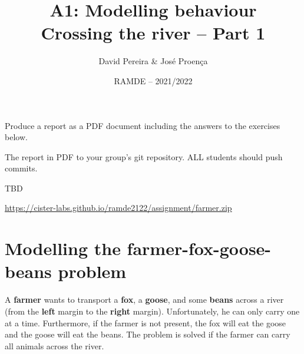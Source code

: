 \documentclass[11pt]{article}
\date{RAMDE -- 2021/2022}
\begin{document}
 
 
\title{A1: Modelling behaviour\\
{\Large Crossing the river -- Part 1}}

\author{David Pereira \& Jos\'{e} Proen\c{c}a} 


\maketitle

\vspace*{-3mm}
 Produce a report as a PDF document including the answers to the exercises below.

 The report in PDF to your group's git repository. ALL students should push commits.

 TBD %

 \url{https://cister-labs.github.io/ramde2122/assignment/farmer.zip}


\section*{Modelling the farmer-fox-goose-beans problem}

A \textbf{farmer} wants to transport a \textbf{fox}, a \textbf{goose}, and some \textbf{beans} across a river (from the \textbf{left} margin to the \textbf{right} margin).
Unfortunately, he can only carry one at a time. Furthermore, if the farmer is not present, the fox will eat the goose and the goose will eat the beans. The problem is solved if the farmer can carry all animals across the river.



\end{document}
